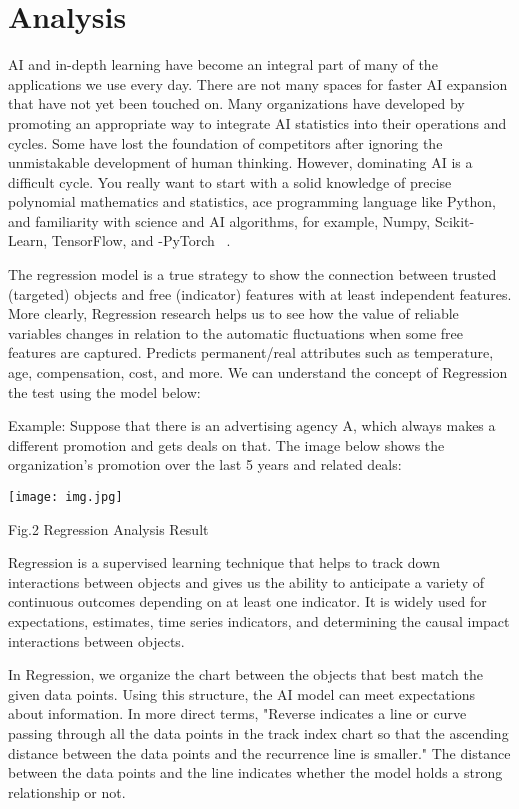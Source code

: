\documentclass[10pt]{aa}
\begin{document}
\section{Analysis}
AI and in-depth learning have become an integral part of many of the applications we use every day. There are not many spaces for faster AI expansion that have not yet been touched on. Many organizations have developed by promoting an appropriate way to integrate AI statistics into their operations and cycles. Some have lost the foundation of competitors after ignoring the unmistakable development of human thinking. However, dominating AI is a difficult cycle. You really want to start with a solid knowledge of precise polynomial mathematics and statistics, ace programming language like Python, and familiarity with science and AI algorithms, for example, Numpy, Scikit-Learn, TensorFlow, and -PyTorch ~\cite{butler_2018_machine}.

The regression model is a true strategy to show the connection between trusted (targeted) objects and free (indicator) features with at least independent features. More clearly, Regression research helps us to see how the value of reliable variables changes in relation to the automatic fluctuations when some free features are captured. Predicts permanent/real attributes such as temperature, age, compensation, cost, and more. We can understand the concept of Regression the test using the model below:

Example: Suppose that there is an advertising agency A, which always makes a different promotion and gets deals on that. The image below shows the organization's promotion over the last 5 years and related deals:

\texttt{[image: img.jpg]}
\caption{Fig.2 Regression Analysis Result}
\label{FigVibStab}

Regression is a supervised learning technique that helps to track down interactions between objects and gives us the ability to anticipate a variety of continuous outcomes depending on at least one indicator. It is widely used for expectations, estimates, time series indicators, and determining the causal impact interactions between objects.

In Regression, we organize the chart between the objects that best match the given data points. Using this structure, the AI model can meet expectations about information. In more direct terms, "Reverse indicates a line or curve passing through all the data points in the track index chart so that the ascending distance between the data points and the recurrence line is smaller." The distance between the data points and the line indicates whether the model holds a strong relationship or not.
\end{document}
